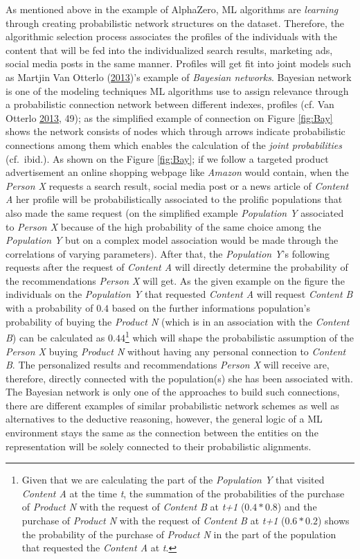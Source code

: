 \documentclass[12pt,twoside]{report}
\let\rmarkdownfootnote\footnote%
\def\footnote{\protect\rmarkdownfootnote}
\begin{document}
As mentioned above in the example of AlphaZero, ML algorithms are \emph{learning} through creating probabilistic network structures on the dataset. Therefore, the algorithmic selection process associates the profiles of the individuals with the content that will be fed into the individualized search results, marketing ads, social media posts in the same manner. Profiles will get fit into joint models such as Martjin Van Otterlo (\protect\hyperlink{ref-Otterlo2013}{2013})'s example of \emph{Bayesian networks}. Bayesian network is one of the modeling techniques ML algorithms use to assign relevance through a probabilistic connection network between different indexes, profiles (cf. Van Otterlo \protect\hyperlink{ref-Otterlo2013}{2013}, 49); as the simplified example of connection on Figure \ref{fig:Bay} shows the network consists of nodes which through arrows indicate probabilistic connections among them which enables the calculation of the \emph{joint probabilities} (cf.~ibid.). As shown on the Figure \ref{fig:Bay}; if we follow a targeted product advertisement an online shopping webpage like \emph{Amazon} would contain, when the \emph{Person X} requests a search result, social media post or a news article of \emph{Content A} her profile will be probabilistically associated to the prolific populations that also made the same request (on the simplified example \emph{Population Y} associated to \emph{Person X} because of the high probability of the same choice among the \emph{Population Y} but on a complex model association would be made through the correlations of varying parameters). After that, the \emph{Population Y}'s following requests after the request of \emph{Content A} will directly determine the probability of the recommendations \emph{Person X} will get. As the given example on the figure the individuals on the \emph{Population Y} that requested \emph{Content A} will request \emph{Content B} with a probability of \(0.4\) based on the further informations population's probability of buying the \emph{Product N} (which is in an association with the \emph{Content B}) can be calculated as \(0.44\)\footnote{Given that we are calculating the part of the \emph{Population Y} that visited \emph{Content A} at the time \emph{t}, the summation of the probabilities of the purchase of \emph{Product N} with the request of \emph{Content B} at \emph{t+1} (\(0.4*0.8\)) and the purchase of \emph{Product N} with the request of \emph{Content B} at \emph{t+1} (\(0.6*0.2\)) shows the probability of the purchase of \emph{Product N} in the part of the population that requested the \emph{Content A} at \emph{t}.} which will shape the probabilistic assumption of the \emph{Person X} buying \emph{Product N} without having any personal connection to \emph{Content B}. The personalized results and recommendations \emph{Person X} will receive are, therefore, directly connected with the population(s) she has been associated with. The Bayesian network is only one of the approaches to build such connections, there are different examples of similar probabilistic network schemes as well as alternatives to the deductive reasoning, however, the general logic of a ML environment stays the same as the connection between the entities on the representation will be solely connected to their probabilistic alignments.
\end{document}
